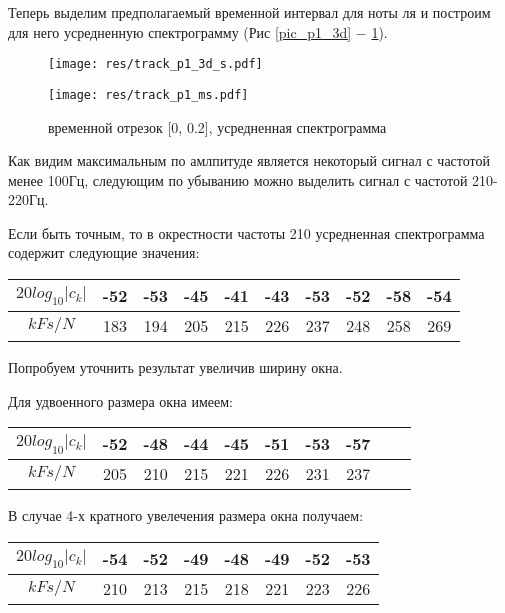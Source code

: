 \documentclass[oneside, final, 14pt]{extarticle}
\begin{document}
  Теперь выделим предполагаемый временной интервал для ноты ля и построим
  для него усредненную спектрограмму (Рис \ref{pic_p1_3d} $-$ \ref{pic_p1_ms}).

  \begin{figure}[t]
    \begin{multicols}{2}
      \hfill
      \texttt{[image: res/track\_p1\_3d\_s.pdf]}
      \hfill
      \caption{временной отрезок [0, 0.2], 3D спектрограмма }
      \label{pic_p1_3d}
      \hfill
      \texttt{[image: res/track\_p1\_ms.pdf]}
      \hfill
      \caption{временной отрезок [0, 0.2], усредненная спектрограмма }
      \label{pic_p1_ms}
    \end{multicols}
  \end{figure}

  Как видим максимальным по амлпитуде является некоторый сигнал с частотой менее
  100Гц, следующим по убыванию можно выделить сигнал с частотой 210-220Гц.

  Если быть точным, то в окрестности частоты 210 усредненная спектрограмма содержит
  следующие значения:

  \begin{tabular}[t]{|c|c|c|c|c|c|c|c|c|c|}
    \hline
    $20 log_{10}|c_k|$ & -52 & -53 & -45 & -41 & -43 & -53 & -52 & -58 & -54 \\
    \hline
    $k Fs/N$ & 183 & 194 & 205 & 215 & 226 & 237 & 248 & 258 & 269 \\
    \hline
  \end{tabular}

  Попробуем уточнить результат увеличив ширину окна.

  Для удвоенного размера окна имеем:

  \begin{tabular}[t]{|c|c|c|c|c|c|c|c|c|c|}
    \hline
    $20 log_{10}|c_k|$ & -52 & -48 & -44 & -45 & -51 & -53 & -57 \\
    \hline
    $k Fs/N$ & 205 & 210 & 215 & 221 & 226 & 231 & 237 \\
    \hline
  \end{tabular}

  В случае 4-х кратного увелечения размера окна получаем:

  \begin{tabular}[t]{|c|c|c|c|c|c|c|c|}
    \hline
    $20 log_{10}|c_k|$ & -54 & -52 & -49 & -48 & -49 & -52 & -53 \\
    \hline
    $k Fs/N$ & 210 & 213 & 215 & 218 & 221 & 223 & 226 \\
    \hline
  \end{tabular}
\end{document}
